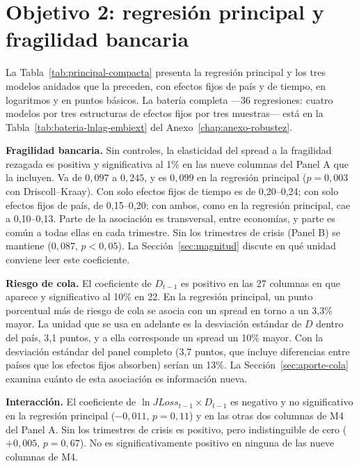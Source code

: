 \section{Objetivo 2: regresión principal y fragilidad bancaria}
\label{sec:bateria}

La Tabla~\ref{tab:principal-compacta} presenta la regresión principal y los tres modelos anidados que la preceden, con efectos fijos de país y de tiempo, en logaritmos y en puntos básicos. La batería completa ---36 regresiones: cuatro modelos por tres estructuras de efectos fijos por tres muestras--- está en la Tabla~\ref{tab:bateria-lnlag-embiext} del Anexo~\ref{chap:anexo-robustez}.



\textbf{Fragilidad bancaria.} Sin controles, la elasticidad del spread a la fragilidad rezagada es positiva y significativa al 1\% en las nueve columnas del Panel A que la incluyen. Va de $0{,}097$ a $0{,}245$, y es $0{,}099$ en la regresión principal ($p=0{,}003$ con Driscoll--Kraay). Con solo efectos fijos de tiempo es de 0,20--0,24; con solo efectos fijos de país, de 0,15--0,20; con ambos, como en la regresión principal, cae a 0,10--0,13. Parte de la asociación es transversal, entre economías, y parte es común a todas ellas en cada trimestre. Sin los trimestres de crisis (Panel B) se mantiene ($0{,}087$, $p<0{,}05$). La Sección~\ref{sec:magnitud} discute en qué unidad conviene leer este coeficiente.

\textbf{Riesgo de cola.} El coeficiente de $D_{t-1}$ es positivo en las 27 columnas en que aparece y significativo al 10\% en 22. En la regresión principal, un punto porcentual más de riesgo de cola se asocia con un spread en torno a un 3,3\% mayor. La unidad que se usa en adelante es la desviación estándar de $D$ dentro del país, 3,1 puntos, y a ella corresponde un spread un 10\% mayor. Con la desviación estándar del panel completo (3,7 puntos, que incluye diferencias entre países que los efectos fijos absorben) serían un 13\%. La Sección~\ref{sec:aporte-cola} examina cuánto de esta asociación es información nueva.

\textbf{Interacción.} El coeficiente de $\ln JLoss_{t-1}\times D_{t-1}$ es negativo y no significativo en la regresión principal ($-0{,}011$, $p=0{,}11$) y en las otras dos columnas de M4 del Panel A. Sin los trimestres de crisis es positivo, pero indistinguible de cero ($+0{,}005$, $p=0{,}67$). No es significativamente positivo en ninguna de las nueve columnas de M4.

